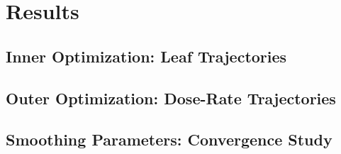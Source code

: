 \section{Results}


\subsection{Inner Optimization:  Leaf Trajectories}



\subsection{Outer Optimization:  Dose-Rate Trajectories}


\subsection{Smoothing Parameters:  Convergence Study}
